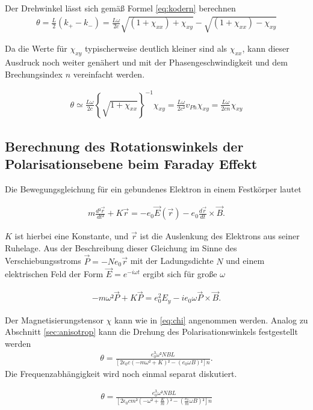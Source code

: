 Der Drehwinkel lässt sich gemäß Formel \eqref{eq:kodern} berechnen
\begin{align}
	\theta = \frac{L}{2}(k_+ -k_-) = \frac{L\omega}{2c}{ \sqrt{(1+ \chi_{xx} )+ \chi_{xy}} - \sqrt{(1+ \chi_{xx} )-\chi_{xy}} }
\end{align}

Da die Werte für $\chi_{xy}$ typischerweise deutlich kleiner sind als
$\chi_{xx}$, kann dieser Ausdruck noch weiter genähert und mit der
Phasengeschwindigkeit und dem Brechungsindex $n$ vereinfacht werden.

\begin{align}
	\theta \simeq \frac{L \omega}{2c}\left\{ \sqrt{1+\chi_{xx}}\right\}^{-1} \chi_{xy} =\frac{L \omega}{2c²} v_{Ph} \chi_{xy} = \frac{L \omega}{2c n} \chi_{xy}
\end{align}

\subsection{Berechnung des Rotationswinkels der Polarisationsebene beim Faraday Effekt \cite{man_a} }
Die Bewegungsgleichung für ein gebundenes Elektron in einem Festkörper lautet

\begin{align}
	m \frac{d² \vec{r}}{d t²} + K \vec{r} = -e_0 \vec{E}(\vec{r})- e_0 \frac{d \vec{r}}{dt} \times \vec{B}.
\end{align}

$K$ ist hierbei eine Konstante, und $\vec{r}$ ist die Auslenkung des Elektrons aus seiner Ruhelage.
Aus der Beschreibung dieser Gleichung im Sinne des Verschiebungsstroms $\vec{P} = -N e_0 \vec{r}$
mit der Ladungsdichte $N$
und einem elektrischen Feld der Form $\vec{E} = e^{- i \omega t}$ ergibt sich für große $\omega$

\begin{align}
	-m\omega² \vec{P} + K \vec{P} = e_0^2 E_y -i e_0 \omega \vec{P} \times \vec{B}.
\end{align}

Der Magnetisierungstensor $\chi$ kann wie in \eqref{eq:chi} angenommen werden.
Analog zu Abschnitt \ref{sec:anisotrop} kann die Drehung des Polarisationswinkels festgestellt werden
\begin{align}
	\theta = \frac{e_0^3 \omega² NBL}{[2 \epsilon_0 c(-m\omega²+ K)² -(e_0 \omega B)²]n}.
\end{align}
Die Frequenzabhängigkeit wird noch einmal separat diskutiert.

\begin{align}
	\theta = \frac{e_0^3 \omega² NBL}{[2 \epsilon_0 c m²(-\omega²+ \frac{K}{m})² -(\frac{e_0}{m}\omega B)²]n}
\end{align}

